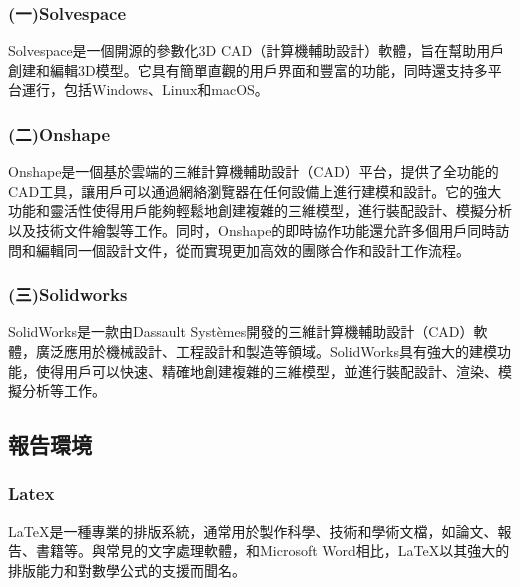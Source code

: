 \subsubsection{(一)Solvespace}
Solvespace是一個開源的參數化3D CAD（計算機輔助設計）軟體，旨在幫助用戶創建和編輯3D模型。它具有簡單直觀的用戶界面和豐富的功能，同時還支持多平台運行，包括Windows、Linux和macOS。\\
\subsubsection{(二)Onshape}
Onshape是一個基於雲端的三維計算機輔助設計（CAD）平台，提供了全功能的CAD工具，讓用戶可以通過網絡瀏覽器在任何設備上進行建模和設計。它的強大功能和靈活性使得用戶能夠輕鬆地創建複雜的三維模型，進行裝配設計、模擬分析以及技術文件繪製等工作。同时，Onshape的即時協作功能還允許多個用戶同時訪問和編輯同一個設計文件，從而實現更加高效的團隊合作和設計工作流程。\\
\subsubsection{(三)Solidworks}
SolidWorks是一款由Dassault Systèmes開發的三維計算機輔助設計（CAD）軟體，廣泛應用於機械設計、工程設計和製造等領域。SolidWorks具有強大的建模功能，使得用戶可以快速、精確地創建複雜的三維模型，並進行裝配設計、渲染、模擬分析等工作。\\
\subsection{報告環境}
\subsubsection{Latex}
LaTeX是一種專業的排版系統，通常用於製作科學、技術和學術文檔，如論文、報告、書籍等。與常見的文字處理軟體，和Microsoft Word相比，LaTeX以其強大的排版能力和對數學公式的支援而聞名。

\newpage

\renewcommand{\baselinestretch}{0.5} %